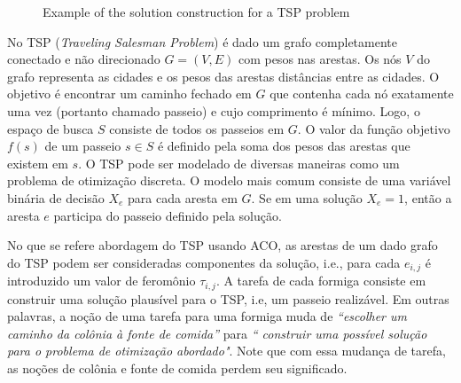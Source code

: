 \begin{figure}[ht]
  \caption{Example of the solution construction for a TSP problem}
  \label{img:exemp_aco}
\end{figure}

No TSP (\textit{Traveling Salesman Problem}) é dado um grafo completamente conectado e
não direcionado $G = (V , E)$ com pesos nas arestas.
Os nós $V$ do grafo representa as cidades e os pesos das arestas
distâncias entre as cidades. O objetivo é encontrar um caminho fechado em $G$
que contenha cada nó exatamente uma vez (portanto chamado passeio)
e cujo comprimento é mínimo. Logo, o espaço de busca $S$ consiste de todos os
passeios em $G$. O valor da função objetivo $f(s)$ de um passeio $s \in S$ 
é definido pela soma dos pesos das arestas que existem em $s$. O TSP pode ser
modelado de diversas maneiras como um problema de otimização discreta.
O modelo mais comum consiste de uma variável binária de decisão $X_e$ para
cada aresta em $G$.
Se em uma solução $X_e = 1$, então a aresta $e$ participa do passeio definido pela solução.

No que se refere abordagem do TSP usando ACO, 
as arestas de um dado grafo do TSP podem ser consideradas componentes da solução,
i.e., para cada $e_{i,j}$ é introduzido um valor de feromônio $\tau_{i,j}$. 
A tarefa de cada formiga consiste em construir uma solução plausível para o TSP, i.e,
um passeio realizável. Em outras palavras, a noção de uma tarefa para uma formiga
muda de \textit{“escolher um caminho da colônia à fonte de comida”} para \textit{“
construir uma possível solução para o problema de otimização abordado"}. Note que com essa
mudança de tarefa, as noções de colônia e fonte de comida perdem seu significado.


